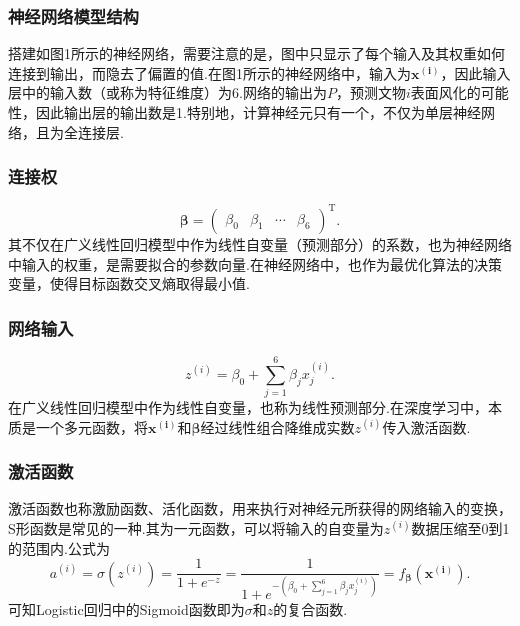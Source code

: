 \subsubsection{神经网络模型结构}

搭建如图1所示的神经网络，需要注意的是，图中只显示了每个输入及其权重如何连接到输出，而隐去了偏置的值.在图1所示的神经网络中，输入为$\boldsymbol{x^{(i)}}$，因此输入层中的输入数（或称为特征维度）为6.网络的输出为$P$，预测文物$i$表面风化的可能性，因此输出层的输出数是1.特别地，计算神经元只有一个，不仅为单层神经网络，且为全连接层.

\subsubsection{连接权}

\begin{equation}
	\boldsymbol{\beta}= \left(\begin{array}{cccc}
     \beta_0 & \beta_1 & \cdots & \beta_6
   \end{array}\right)^{\mathrm{T}}.
\end{equation}
其不仅在广义线性回归模型中作为线性自变量（预测部分）的系数，也为神经网络中输入的权重，是需要拟合的参数向量.在神经网络中，也作为最优化算法的决策变量，使得目标函数交叉熵取得最小值.

\subsubsection{网络输入}

\begin{equation}
	z^{(i)} = \beta_0 + \sum^6_{j = 1} \beta_j x^{(i)}_j.
\end{equation}
在广义线性回归模型中作为线性自变量，也称为线性预测部分.在深度学习中，本质是一个多元函数，将$\boldsymbol{x^{(i)}}$和$\boldsymbol{\beta}$经过线性组合降维成实数$z^{(i)}$传入激活函数.

\subsubsection{激活函数}

激活函数也称激励函数、活化函数，用来执行对神经元所获得的网络输入的变换，S形函数是常见的一种.其为一元函数，可以将输入的自变量为$z^{(i)}$数据压缩至0到1的范围内.公式为
\begin{equation}
	a^{(i)} = \sigma (z^{(i)}) = \frac{1}{1 + e^{- z}} = \frac{1}{1 + e^{-
   \left( \beta_0 + \sum^6_{j = 1} \beta_j x^{(i)}_j \right)}} =
   f_{\boldsymbol{\beta}} (\boldsymbol{x^{(i)}}).
\end{equation}
可知Logistic回归中的Sigmoid函数即为$\sigma$和$z$的复合函数.

